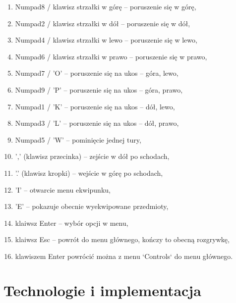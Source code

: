 \documentclass[12pt,twoside]{article}
\begin{document}
\begin{enumerate}
	\item Numpad8 / klawisz strzałki w górę -- poruszenie się w górę,
	\item Numpad2 / klawisz strzałki w dół -- poruszenie się w dół,
	\item Numpad4 / klawisz strzałki w lewo -- poruszenie się w lewo,
	\item Numpad6 / klawisz strzałki w prawo -- poruszenie się w prawo,
	\item Numpad7 / 'O' -- poruszenie się na ukos -- góra, lewo,
	\item Numpad9 / 'P' -- poruszenie się na ukos -- góra, prawo,
	\item Numpad1 / 'K' -- poruszenie się na ukos -- dół, lewo,
	\item Numpad3 / 'L' -- poruszenie się na ukos -- dół, prawo,
	\item Numpad5 / 'W' -- pominięcie jednej tury,
	\item ',' (klawisz przecinka) -- zejście w dół po schodach,
	\item '.' (klawisz kropki) -- wejście w górę po schodach,
	\item 'I' -- otwarcie menu ekwipunku,
	\item 'E' -- pokazuje obecnie wyekwipowane przedmioty,
	\item klaiwsz Enter -- wybór opcji w menu,
	\item klaiwsz Esc -- powrót do menu głównego, kończy to obecną rozgrywkę,
	\item klawiszem Enter powrócić można z menu `Controls` do menu głównego.
\end{enumerate}


\subsection{}



\clearpage	

\section{Technologie i implementacja}
\end{document}
